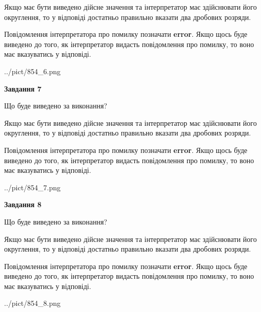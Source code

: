 \documentclass[12pt, ukrainian]{article}
\begin{document}
{\begin {Large}
Якщо має бути виведено дійсне значення та інтерпретатор має здійснювати його округлення, 
то у відповіді достатньо правильно вказати два дробових розряди.

Повідомлення інтерпретатора про помилку позначати \textbf{error}.
Якщо щось буде виведено до того, як інтерпретатор видасть повідомлення про помилку, 
то воно має вказуватись у відповіді. \par

\begin{center}
	{../pict/854_6.png}
\end{center}
\newpage

{\begin {center}\textbf{Завдання 7}\end {center}}\par
Що буде виведено за виконання? \par

Якщо має бути виведено дійсне значення та інтерпретатор має здійснювати його округлення, 
то у відповіді достатньо правильно вказати два дробових розряди.

Повідомлення інтерпретатора про помилку позначати \textbf{error}.
Якщо щось буде виведено до того, як інтерпретатор видасть повідомлення про помилку, 
то воно має вказуватись у відповіді. \par

\begin{center}
	{../pict/854_7.png}
\end{center}
\newpage

{\begin {center}\textbf{Завдання 8}\end {center}}\par
Що буде виведено за виконання? \par

Якщо має бути виведено дійсне значення та інтерпретатор має здійснювати його округлення, 
то у відповіді достатньо правильно вказати два дробових розряди.

Повідомлення інтерпретатора про помилку позначати \textbf{error}.
Якщо щось буде виведено до того, як інтерпретатор видасть повідомлення про помилку, 
то воно має вказуватись у відповіді. \par

\begin{center}
	{../pict/854_8.png}
\end{center}
\newpage


\end{Large}}
\end{document}
